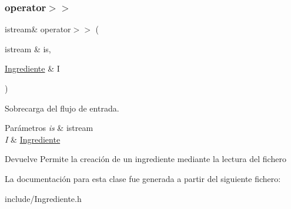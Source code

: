 \subsubsection{\texorpdfstring{operator$>$$>$}{operator>>}}
{\footnotesize\ttfamily istream\& operator$>$$>$ (\begin{DoxyParamCaption}\item[{istream \&}]{is,  }\item[{\hyperlink{classIngrediente}{Ingrediente} \&}]{I }\end{DoxyParamCaption})\hspace{0.3cm}{\ttfamily [friend]}}



Sobrecarga del flujo de entrada. 


\begin{DoxyParams}{Parámetros}
{\em is} & istream \\
\hline
{\em I} & \hyperlink{classIngrediente}{Ingrediente} \\
\hline
\end{DoxyParams}
\begin{DoxyReturn}{Devuelve}
Permite la creación de un ingrediente mediante la lectura del fichero 
\end{DoxyReturn}


La documentación para esta clase fue generada a partir del siguiente fichero\+:\begin{DoxyCompactItemize}
\item 
include/Ingrediente.\+h\end{DoxyCompactItemize}

